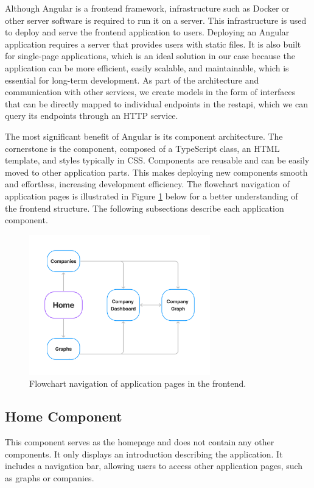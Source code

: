 Although Angular is a frontend framework, infrastructure such as Docker or other server software is required to run it on a server. This infrastructure is used to deploy and serve the frontend application to users. Deploying an Angular application requires a server that provides users with static files. It is also built for single-page applications, which is an ideal solution in our case because the application can be more efficient, easily scalable, and maintainable, which is essential for long-term development. As part of the architecture and communication with other services, we create models in the form of interfaces that can be directly mapped to individual endpoints in the \acrshort{restapi}, which we can query its endpoints through an HTTP service.

The most significant benefit of Angular is its component architecture. The cornerstone is the component, composed of a TypeScript class, an HTML template, and styles typically in CSS. Components are reusable and can be easily moved to other application parts. This makes deploying new components smooth and effortless, increasing development efficiency. The flowchart navigation of application pages is illustrated in Figure \ref{fig:architecture-frontend-flowchart} below for a better understanding of the frontend structure. The following subsections describe each application component.

\begin{figure}[ht]
    \centering
    \includegraphics[width=0.7\textwidth]{img/architecture/website-flowchart.pdf}
    \caption{Flowchart navigation of application pages in the frontend.}
    \label{fig:architecture-frontend-flowchart}
\end{figure}

\subsection{Home Component}
\label{subsec:frontend-home}
This component serves as the homepage and does not contain any other components. It only displays an introduction describing the application. It includes a navigation bar, allowing users to access other application pages, such as graphs or companies.

